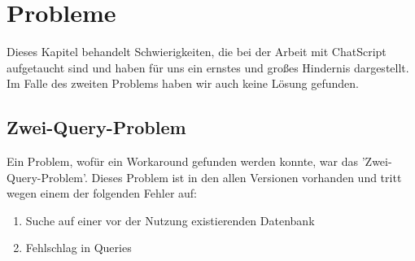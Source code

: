 \chapter{Probleme}
\label{sec:Probleme}

Dieses Kapitel behandelt Schwierigkeiten, die bei der Arbeit mit ChatScript aufgetaucht sind und haben für uns ein ernstes und großes Hindernis dargestellt. Im Falle des zweiten Problems haben wir auch keine Lösung gefunden.\\


\section{Zwei-Query-Problem}
\label{Section: Zwei-Query Problem}

Ein Problem, wofür ein Workaround gefunden werden konnte, war das 'Zwei-Query-Problem'. Dieses Problem ist in den allen Versionen vorhanden und tritt wegen einem der folgenden Fehler auf:

\begin{enumerate}
\item {Suche auf einer vor der Nutzung existierenden Datenbank}
\item {Fehlschlag in Queries}
\end{enumerate}  

